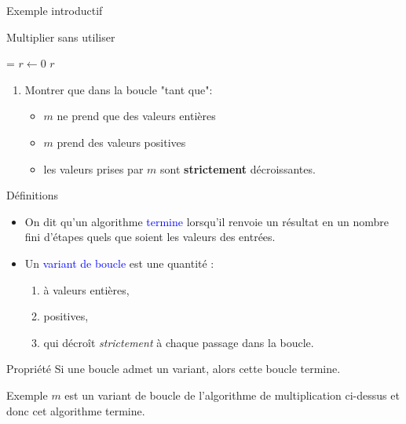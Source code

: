 \documentclass[10pt,french]{beamer}
\begin{document}
\begin{frame}[fragile]{\Ctitle}{\stitle}
	\begin{block}{Exemple introductif}
		\SetAlFnt{\small}
		\setlength{\algomargin}{8pt}
		\begin{algorithm}[H]
			\DontPrintSemicolon
			\caption{Multiplier sans utiliser {\tt *}}
			\everypar={\footnotesize \textcolor{gray}{\nl}}
			$r \leftarrow 0$\;
			\Return $r$
		\end{algorithm}
		\begin{enumerate}
			\item<2-> Montrer que dans la boucle "tant que":
				\begin{itemize}
					\item<3-> $m$ ne prend que des valeurs entières
					\item<4-> $m$ prend des valeurs positives
					\item<5-> les valeurs prises par $m$ sont \textbf{strictement} décroissantes.
				\end{itemize}
		\end{enumerate}
	\end{block}
\end{frame}

\begin{frame}[fragile]{\Ctitle}{\stitle}
	\begin{block}{Définitions}
		\begin{itemize}
			\item<2-> On dit qu'un algorithme \textcolor{blue}{termine} lorsqu'il renvoie un résultat en un nombre fini d'étapes quels que soient les valeurs des entrées.
			\item<3-> Un \textcolor{blue}{variant de boucle} est une quantité :
				\begin{enumerate}
					\item<4-> à valeurs entières,
					\item<5-> positives,
					\item<6-> qui décroît \textit{strictement} à chaque passage dans la boucle.
				\end{enumerate}
		\end{itemize}
	\end{block}
	{\begin{alertblock}{\textcolor{yellow}{\important \;} Propriété}
			Si une boucle admet un variant, alors cette boucle termine.
		\end{alertblock}}
	{
		\begin{exampleblock}{Exemple}
			$m$ est un variant de boucle de l'algorithme de multiplication ci-dessus et donc cet algorithme termine.
		\end{exampleblock}
	}
\end{frame}
\end{document}
